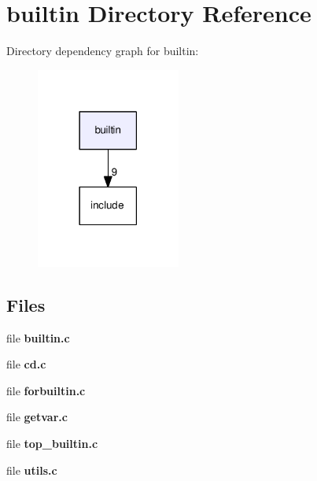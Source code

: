 \section{builtin Directory Reference}
\label{dir_dcd6bf565d8b6008694ea35f4b77d1ca}
Directory dependency graph for builtin\-:
\nopagebreak
\begin{figure}[H]
\begin{center}
\leavevmode
\includegraphics[width=134pt]{dir_dcd6bf565d8b6008694ea35f4b77d1ca_dep}
\end{center}
\end{figure}
\subsection*{Files}
\begin{DoxyCompactItemize}
\item 
file {\bf builtin.\-c}
\item 
file {\bf cd.\-c}
\item 
file {\bf forbuiltin.\-c}
\item 
file {\bf getvar.\-c}
\item 
file {\bf top\-\_\-builtin.\-c}
\item 
file {\bf utils.\-c}
\end{DoxyCompactItemize}
